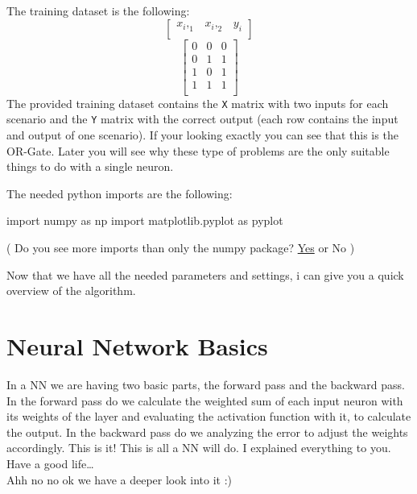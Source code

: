 \documentclass[
]{book}
\newenvironment{Shaded}{\begin{snugshade}}{\end{snugshade}}
\newcommand{\ImportTok}[1]{#1}
\newcommand{\NormalTok}[1]{#1}
\begin{document}
The training dataset is the following:
\[
\left[
\begin{array}{cc|c}
x_i,_1 & x_i,_2 & y_i \\
\end{array}
\right]
\]
\[
\left[
\begin{array}{cc|c}
0 & 0 & 0 \\
0 & 1 & 1 \\
1 & 0 & 1 \\
1 & 1 & 1 \\
\end{array}
\right]
\]
The provided training dataset contains the \texttt{X} matrix with two inputs for each scenario and the \texttt{Y} matrix with the correct output (each row contains the input and output of one scenario). If your looking exactly you can see that this is the OR-Gate. Later you will see why these type of problems are the only suitable things to do with a single neuron.

The needed python imports are the following:

\begin{Shaded}
\begin{Highlighting}[]
\ImportTok{import}\NormalTok{ numpy }\ImportTok{as}\NormalTok{ np}
\ImportTok{import}\NormalTok{ matplotlib.pyplot }\ImportTok{as}\NormalTok{ pyplot}
\end{Highlighting}
\end{Shaded}

( Do you see more imports than only the numpy package? \href{https://www.youtube.com/watch?v=dQw4w9WgXcQ}{Yes} or No )

Now that we have all the needed parameters and settings, i can give you a quick overview of the algorithm.

\hypertarget{neural-network-basics}{%
\section{Neural Network Basics}\label{neural-network-basics}}

In a NN we are having two basic parts, the forward pass and the backward pass. In the forward pass do we calculate the weighted sum of each input neuron with its weights of the layer and evaluating the activation function with it, to calculate the output. In the backward pass do we analyzing the error to adjust the weights accordingly. This is it! This is all a NN will do. I explained everything to you. Have a good life\ldots{}\\
Ahh no no ok we have a deeper look into it :)
\end{document}
